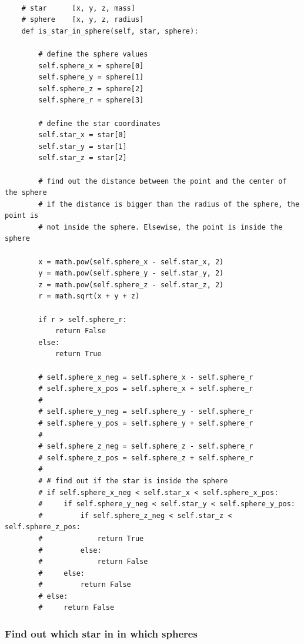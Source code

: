 \begin{lstlisting}

    # star      [x, y, z, mass]
    # sphere    [x, y, z, radius]
    def is_star_in_sphere(self, star, sphere):

        # define the sphere values
        self.sphere_x = sphere[0]
        self.sphere_y = sphere[1]
        self.sphere_z = sphere[2]
        self.sphere_r = sphere[3]

        # define the star coordinates
        self.star_x = star[0]
        self.star_y = star[1]
        self.star_z = star[2]

        # find out the distance between the point and the center of the sphere
        # if the distance is bigger than the radius of the sphere, the point is
        # not inside the sphere. Elsewise, the point is inside the sphere

        x = math.pow(self.sphere_x - self.star_x, 2)
        y = math.pow(self.sphere_y - self.star_y, 2)
        z = math.pow(self.sphere_z - self.star_z, 2)
        r = math.sqrt(x + y + z)

        if r > self.sphere_r:
            return False
        else:
            return True

        # self.sphere_x_neg = self.sphere_x - self.sphere_r
        # self.sphere_x_pos = self.sphere_x + self.sphere_r
        #
        # self.sphere_y_neg = self.sphere_y - self.sphere_r
        # self.sphere_y_pos = self.sphere_y + self.sphere_r
        #
        # self.sphere_z_neg = self.sphere_z - self.sphere_r
        # self.sphere_z_pos = self.sphere_z + self.sphere_r
        #
        # # find out if the star is inside the sphere
        # if self.sphere_x_neg < self.star_x < self.sphere_x_pos:
        #     if self.sphere_y_neg < self.star_y < self.sphere_y_pos:
        #         if self.sphere_z_neg < self.star_z < self.sphere_z_pos:
        #             return True
        #         else:
        #             return False
        #     else:
        #         return False
        # else:
        #     return False

\end{lstlisting}

\subsubsection{Find out which star in in which spheres}

